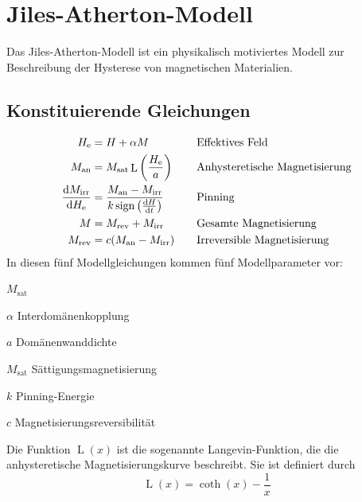 \documentclass{scrartcl}
\DeclareMathOperator{\sign}{sign}
\DeclareMathOperator{\Langevin}{L}
\newcommand{\He}{H_\text{e}}
\newcommand{\Man}{M_\text{an}}
\newcommand{\Msat}{M_\text{sat}}
\newcommand{\Mirr}{M_\text{irr}}
\newcommand{\Mrev}{M_\text{rev}}
\begin{document}
\section{Jiles-Atherton-Modell}
\label{sec:jiles-atherton}
Das Jiles-Atherton-Modell ist ein physikalisch motiviertes Modell zur Beschreibung der Hysterese von magnetischen Materialien.
\subsection{Konstituierende Gleichungen}
\begin{align}
	\He &= H + \alpha M \quad &&\text{Effektives Feld} \label{eq:h_eff}\\
	\Man &= \Msat \Langevin\left(\frac{\He}{a}\right) \quad &&\text{Anhysteretische Magnetisierung}  \label{eq:m_an}\\
	\frac{\dif\Mirr}{\dif \He} &= \frac{\Man - \Mirr}{k \sign\left(\frac{\dif H}{\dif t}\right)} \quad &&\text{Pinning} \label{eq:pinning}\\
	M &= \Mrev + \Mirr \quad &&\text{Gesamte Magnetisierung} \label{eq:m_gesamt}\\
	\Mrev &= c(\Man - \Mirr) \quad &&\text{Irreversible Magnetisierung} \label{eq:m_rev}
\end{align}
In diesen fünf Modellgleichungen kommen fünf Modellparameter vor:
\begin{labeling}{$\Msat$}
	\item[$\alpha$]{Interdomänenkopplung}
	\item[$a$]{Domänenwanddichte}
	\item[$\Msat$]{Sättigungsmagnetisierung}
	\item[$k$]{Pinning-Energie}
	\item[$c$]{Magnetisierungsreversibilität}
\end{labeling}
Die Funktion $\Langevin(x)$ ist die sogenannte Langevin-Funktion, die die anhysteretische Magnetisierungskurve beschreibt. Sie ist definiert durch
\begin{equation}
	\Langevin(x) = \coth(x) - \frac{1}{x}
\end{equation}
\end{document}
